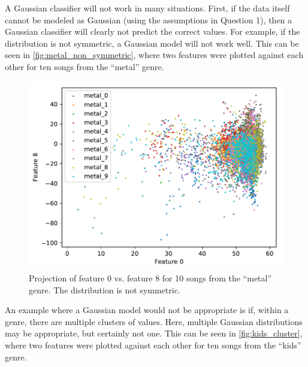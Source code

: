 \documentclass[a4paper,titlepage]{article}
\begin{document}
	
	A Gaussian classifier will not work in many situations. First, if the data itself cannot be modeled as Gaussian (using the assumptions in Question 1), then a Gaussian classifier will clearly not predict the correct values. For example, if the distribution is not symmetric, a Gaussian model will not work well. This can be seen in \autoref{fig:metal_non_symmetric}, where two features were plotted against each other for ten songs from the ``metal'' genre.
	
	
	\begin{figure}[!htb]
		\centering
		\includegraphics[width=\columnwidth]{plots/metal_non_symmetric.pdf}
		\caption
		{Projection of feature 0 vs. feature 8 for 10 songs from the ``metal'' genre. The distribution is not symmetric.}
		\label{fig:metal_non_symmetric}
	\end{figure}
	
	An example where a Gaussian model would not be appropriate is if, within a genre, there are multiple clusters of values. Here, multiple Gaussian distributions may be appropriate, but certainly not one. This can be seen in \autoref{fig:kids_cluster}, where two features were plotted against each other for ten songs from the ``kids'' genre.
	
	
\end{document}
